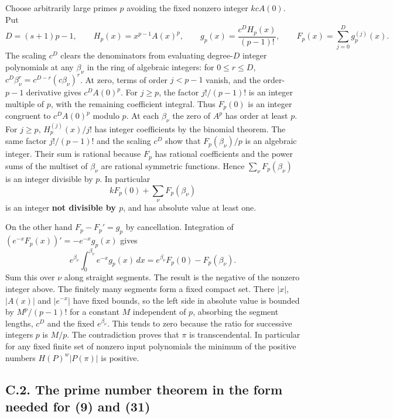 \documentclass[11pt,a4paper]{article}
\begin{document}
Choose arbitrarily large primes \(p\) avoiding the fixed nonzero integer \(kcA(0)\). Put \[
 D=(s+1)p-1,\qquad H_p(x)=x^{p-1} A(x)^p,\qquad
 g_p(x)=\frac{c^D H_p(x)}{(p-1)!},\qquad
 F_p(x)=\sum_{j=0}^{D}g_p^{(j)}(x).
\] The scaling \(c^D\) clears the denominators from evaluating degree-\(D\) integer polynomials at any \(\beta_\nu\) in the ring of algebraic integers: for \(0\le r\le D\), \(c^D\beta_\nu^r=c^{D-r}(c\beta_\nu)^r\). At zero, terms of order \(j<p-1\) vanish, and the order-\(p-1\) derivative gives \(c^D A(0)^p\). For \(j\ge p\), the factor \(j!/(p-1)!\) is an integer multiple of \(p\), with the remaining coefficient integral. Thus \(F_p(0)\) is an integer congruent to \(c^D A(0)^p\) modulo \(p\). At each \(\beta_\nu\) the zero of \(A^p\) has order at least \(p\). For \(j\ge p\), \(H_p^{(j)}(x)/j!\) has integer coefficients by the binomial theorem. The same factor \(j!/(p-1)!\) and the scaling \(c^D\) show that \(F_p(\beta_\nu)/p\) is an algebraic integer. Their sum is rational because \(F_p\) has rational coefficients and the power sums of the multiset of \(\beta_\nu\) are rational symmetric functions. Hence \(\sum_\nu F_p(\beta_\nu)\) is an integer divisible by \(p\). In particular \[
 kF_p(0)+\sum_\nu F_p(\beta_\nu)
\] is an integer \textbf{not divisible by \(p\)}, and has absolute value at least one.

On the other hand \(F_p-F_p'=g_p\) by cancellation. Integration of \((e^{-x}F_p(x))'=-e^{-x}g_p(x)\) gives \[
 e^{\beta_\nu}\int_0^{\beta_\nu} e^{-x}g_p(x)\,dx
       =e^{\beta_\nu}F_p(0)-F_p(\beta_\nu).
\] Sum this over \(\nu\) along straight segments. The result is the negative of the nonzero integer above. The finitely many segments form a fixed compact set. There \(|x|\), \(|A(x)|\) and \(|e^{-x}|\) have fixed bounds, so the left side in absolute value is bounded by \(M^p/(p-1)!\) for a constant \(M\) independent of \(p\), absorbing the segment lengths, \(c^D\) and the fixed \(e^{\beta_\nu}\). This tends to zero because the ratio for successive integers \(p\) is \(M/p\). The contradiction proves that \(\pi\) is transcendental. In particular for any fixed finite set of nonzero input polynomials the minimum of the positive numbers \(H(P)^w |P(\pi)|\) is positive.

\subsection{C.2. The prime number theorem in the form needed for (9) and (31)}\label{c.2.-the-prime-number-theorem-in-the-form-needed-for-9-and-31}
\end{document}
